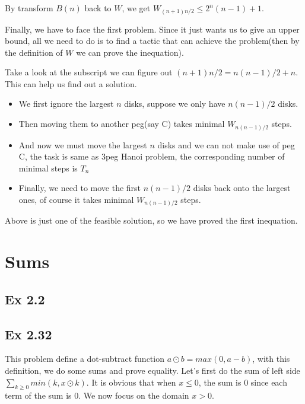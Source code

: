 \documentclass{article}
\begin{document}
By transform $B(n)$ back to $W$, we get $W_{(n+1)n/2} \le 2^{n}(n-1) + 1$.

Finally, we have to face the first problem. Since it just wants us to give an upper bound, all we need to do is to find a tactic that can achieve the problem(then by the definition of $W$ we can prove the inequation).

Take a look at the subscript we can figure out $(n+1)n/2 = n(n-1)/2 + n$. This can help us find out a solution. 
\begin{itemize}
    \item We first ignore the largest $n$ disks, suppose we only have $n(n-1)/2$ disks. \item Then moving them to another peg(say C) takes minimal $W_{n(n-1)/2}$ steps. 
    \item And now we must move the largest $n$ disks and we can not make use of peg C, the task is same as 3peg Hanoi problem, the corresponding number of minimal steps is $T_n$
    \item Finally, we need to move the first $n(n-1)/2$ disks back onto the largest ones, of course it takes minimal $W_{n(n-1)/2}$ steps.
\end{itemize}

Above is just one of the feasible solution, so we have proved the first inequation.

\section{Sums}

\subsection{Ex 2.2}

\subsection{Ex 2.32}

This problem define a dot-subtract function $a \odot b = max(0, a - b)$, with this definition, we do some sums and prove equality. Let's first do the sum of left side $\sum_{k\ge0}min(k, x \odot k)$. It is obvious that when $x\le 0$, the sum is $0$ since each term of the sum is $0$. We now focus on the domain $x > 0$.
\end{document}
